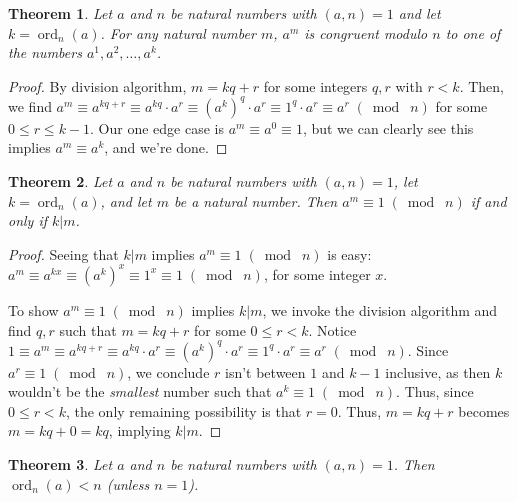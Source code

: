 \documentclass{article}
\DeclareMathOperator{\ord}{ord}
\newtheorem{thm}{Theorem}[section]
\numberwithin{equation}{thm}
\providecommand{\gmod}[1]{\; (\bmod \; #1)}
\begin{document}
\begin{thm} \label{4.9}
  Let $a$ and $n$ be natural numbers with $(a, n) = 1$ and let $k = \ord_n (a)$. For any natural number $m$, $a^m$ is congruent modulo $n$ to one of the numbers $a^1, a^2, \ldots, a^k$.
\end{thm}

\begin{proof}
  By division algorithm, $m = kq + r$ for some integers $q, r$ with $r < k$. Then, we find $a^m \equiv a^{kq + r} \equiv a^{kq} \cdot a^r \equiv (a^k)^q \cdot a^r \equiv 1^q \cdot a^r \equiv a^r \gmod n$ for some $0 \leq r \leq k-1$. Our one edge case is $a^m \equiv a^0 \equiv 1$, but we can clearly see this implies $a^m \equiv a^k$, and we're done.
\end{proof}



\pagebreak



\begin{thm} \label{4.10}
  Let $a$ and $n$ be natural numbers with $(a, n) = 1$, let $k = \ord_n (a)$, and let $m$ be a natural number. Then $a^m \equiv 1 \gmod n$ if and only if $k | m$.
\end{thm}

\begin{proof}
  Seeing that $k | m$ implies $a^m \equiv 1 \gmod n$ is easy: $a^m \equiv a^{kx} \equiv (a^k)^x \equiv 1^x \equiv 1 \gmod n$, for some integer $x$.

  To show $a^m \equiv 1 \gmod n$ implies $k | m$, we invoke the division algorithm and find $q, r$ such that $m = kq + r$ for some $0 \leq r < k$. Notice $1 \equiv a^m \equiv a^{kq + r} \equiv a^{kq} \cdot a^r \equiv (a^k)^q \cdot a^r \equiv 1^q \cdot a^r \equiv a^r \gmod n$.
  Since $a^r \equiv 1 \gmod n$, we conclude $r$ isn't between $1$ and $k-1$ inclusive, as then $k$ wouldn't be the \emph{smallest} number such that $a^k \equiv 1 \gmod n$. Thus, since $0 \leq r < k$, the only remaining possibility is that $r = 0$. Thus, $m = kq + r$ becomes $m = kq + 0 = kq$, implying $k | m$.
\end{proof}



\begin{thm} \label{4.11}
  Let $a$ and $n$ be natural numbers with $(a, n) = 1$. Then $\ord_n (a) < n$ (unless $n = 1$).
\end{thm}
\end{document}
